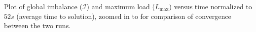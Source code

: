 Plot of global imbalance ($\mathcal{I}$) and maximum load ($L_{\max}$) versus time normalized to $52s$ (average time to solution), zoomed in to for comparison of convergence between the two runs.
